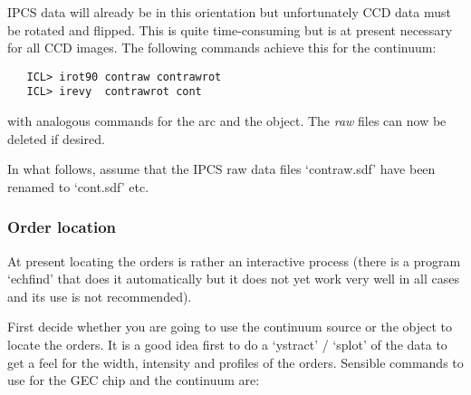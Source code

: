    IPCS data will already be in this orientation but unfortunately CCD
   data must be rotated and flipped. This is quite time-consuming but is
   at present necessary for all CCD images. The following commands
   achieve this for the continuum:

\begin{verbatim}
   ICL> irot90 contraw contrawrot
   ICL> irevy  contrawrot cont
\end{verbatim}

   with analogous commands for the arc and the object. The {\em raw\/}
   files can now be deleted if desired.

   In what follows, assume that the IPCS raw data files `contraw.sdf' have
   been renamed to `cont.sdf' etc.

\begin{latexonly}
\begin{figure}[htb]
\begin{center}
\leavevmode{}
\end{center}
\end{figure}
\end{latexonly}


\subsubsection{\label{techno13locate}Order location}

\begin{latexonly}
\begin{figure}[htb]
\begin{center}
\leavevmode{}
\end{center}
\end{figure}
\end{latexonly}

   At present locating the orders is rather an interactive process
   (there is a program `echfind' that does it automatically but it does
   not yet work very well in all cases and its use is not recommended).

   First decide whether you are going to use the continuum source or the
   object to locate the orders. It is a good idea first to do a
   `ystract' / `splot' of the data to get a feel for the width,
   intensity and profiles of the orders. Sensible commands to use for
   the GEC chip and the continuum are:

